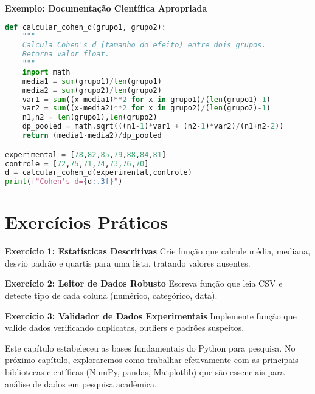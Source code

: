 \begin{examplebox}
\textbf{Exemplo: Documentação Científica Apropriada}

\begin{lstlisting}[language=Python,breaklines=true,postbreak=\mbox{\textcolor{red}{$\hookrightarrow$}\space}]
def calcular_cohen_d(grupo1, grupo2):
    """
    Calcula Cohen's d (tamanho do efeito) entre dois grupos.
    Retorna valor float.
    """
    import math
    media1 = sum(grupo1)/len(grupo1)
    media2 = sum(grupo2)/len(grupo2)
    var1 = sum((x-media1)**2 for x in grupo1)/(len(grupo1)-1)
    var2 = sum((x-media2)**2 for x in grupo2)/(len(grupo2)-1)
    n1,n2 = len(grupo1),len(grupo2)
    dp_pooled = math.sqrt(((n1-1)*var1 + (n2-1)*var2)/(n1+n2-2))
    return (media1-media2)/dp_pooled

experimental = [78,82,85,79,88,84,81]
controle = [72,75,71,74,73,76,70]
d = calcular_cohen_d(experimental,controle)
print(f"Cohen's d={d:.3f}")
\end{lstlisting}
\end{examplebox}

\section{Exercícios Práticos}

\begin{examplebox}
\textbf{Exercício 1: Estatísticas Descritivas}  
Crie função que calcule média, mediana, desvio padrão e quartis para uma lista, tratando valores ausentes.

\textbf{Exercício 2: Leitor de Dados Robusto}  
Escreva função que leia CSV e detecte tipo de cada coluna (numérico, categórico, data).

\textbf{Exercício 3: Validador de Dados Experimentais}  
Implemente função que valide dados verificando duplicatas, outliers e padrões suspeitos.
\end{examplebox}


Este capítulo estabeleceu as bases fundamentais do Python para pesquisa. No próximo capítulo, exploraremos como trabalhar efetivamente com as principais bibliotecas científicas (NumPy, pandas, Matplotlib) que são essenciais para análise de dados em pesquisa acadêmica.

